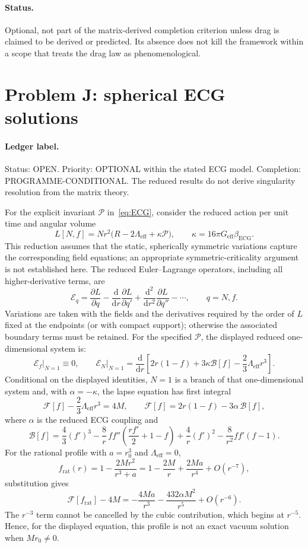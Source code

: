 \paragraph{Status.}
Optional, not part of the matrix-derived completion criterion unless
drag is claimed to be derived or predicted. Its absence does not kill
the framework within a scope that treats the drag law as
phenomenological.

\section{Problem J: spherical ECG solutions}
\label{sec:status-J}

\paragraph{Ledger label.}
Status: OPEN. Priority: OPTIONAL within the stated ECG model.
Completion: PROGRAMME-CONDITIONAL. The reduced results do not derive
singularity resolution from the matrix theory.

For the explicit invariant \(\mathcal P\) in~\eqref{eq:ECG}, consider
the reduced action per unit time and angular volume
\[
L[N,f]=N r^2\bigl(R-2\Lambda_{\mathrm{eff}}+\kappa\mathcal P\bigr),
\qquad
\kappa=16\pi G_{\mathrm{eff}}\beta_{\mathrm{ECG}}.
\]
This reduction assumes that the static, spherically symmetric
variations capture the corresponding field equations; an appropriate
symmetric-criticality argument is not established here. The reduced
Euler--Lagrange operators, including all higher-derivative terms, are
\[
\mathcal E_q
=\frac{\partial L}{\partial q}
-\frac{\mathrm d}{\mathrm dr}\frac{\partial L}{\partial q'}
+\frac{\mathrm d^2}{\mathrm dr^2}\frac{\partial L}{\partial q''}
-\cdots,\qquad q=N,f.
\]
Variations are taken with the fields and the derivatives required by
the order of \(L\) fixed at the endpoints (or with compact support);
otherwise the associated boundary terms must be retained. For the
specified \(\mathcal P\), the displayed reduced one-dimensional
system is:
\[
\left.\mathcal E_f\right|_{N=1}\equiv0,\qquad
\left.\mathcal E_N\right|_{N=1}
=\frac{\mathrm d}{\mathrm dr}
\left[2r(1-f)+3\kappa\mathcal B[f]
-\frac23\Lambda_{\mathrm{eff}}r^3\right].
\]
Conditional on the displayed identities, \(N=1\) is a branch of that one-dimensional system and, with \(\alpha=-\kappa\), the lapse equation has first integral
\[
\mathcal F[f]-\frac23\Lambda_{\mathrm{eff}}r^3=4M,\qquad
\mathcal F[f]=2r(1-f)-3\alpha\,\mathcal B[f],
\]
where \(\alpha\) is the reduced ECG coupling and
\[
\mathcal B[f]
=
\frac43(f')^3
-\frac8r\,ff''
 \left(\frac{rf'}2+1-f\right)
+\frac4r(f')^2
-\frac8{r^2}ff'(f-1).
\]
For the rational profile with \(a=r_0^3\) and
\(\Lambda_{\mathrm{eff}}=0\),
\[
f_{\mathrm{rat}}(r)
=
1-\frac{2Mr^2}{r^3+a}
=
1-\frac{2M}{r}+\frac{2Ma}{r^4}+O(r^{-7}),
\]
substitution gives
\[
\mathcal F[f_{\mathrm{rat}}]-4M
=-\frac{4Ma}{r^3}-\frac{432\alpha M^2}{r^5}+O(r^{-6}).
\]
The \(r^{-3}\) term cannot be cancelled by the cubic contribution,
which begins at \(r^{-5}\). Hence, for the displayed equation, this
profile is not an exact vacuum solution when \(Mr_0\ne0\).

